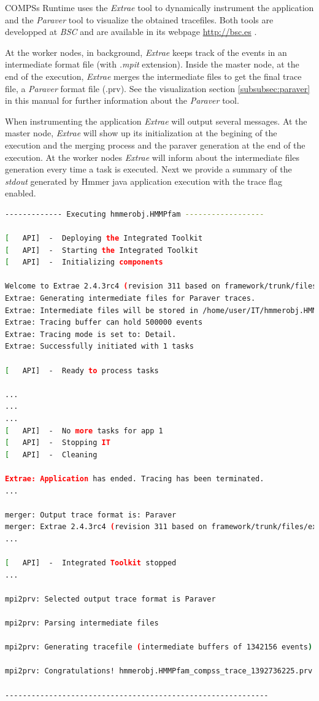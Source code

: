 COMPSs Runtime uses the \textit{Extrae} tool to dynamically instrument the application and the \textit{Paraver} tool to visualize
the obtained tracefiles. Both tools are developped at \textit{BSC} and are available in its webpage \url{http://bsc.es} . 

At the worker nodes, in background, \textit{Extrae} keeps track of the events in an intermediate format 
file (with \textit{.mpit} extension). Inside the master node, at the end of the execution, \textit{Extrae} merges the 
intermediate files to get the final trace file, a \textit{Paraver} format file (.prv). See the visualization 
section \ref{subsubsec:paraver} in this manual for further information about the \textit{Paraver} tool.

When instrumenting the application \textit{Extrae} will output several messages. At the master node, \textit{Extrae} will show up its
initialization at the begining of the execution and the merging process and the paraver generation at the end of the execution. At the
worker nodes \textit{Extrae} will inform about the intermediate files generation every time a task is executed. Next we provide a 
summary of the \textit{stdout} generated by Hmmer java application execution with the trace flag enabled. 
\begin{lstlisting}[language=bash]
------------- Executing hmmerobj.HMMPfam ------------------

[   API]  -  Deploying the Integrated Toolkit
[   API]  -  Starting the Integrated Toolkit
[   API]  -  Initializing components

Welcome to Extrae 2.4.3rc4 (revision 311 based on framework/trunk/files/extrae)
Extrae: Generating intermediate files for Paraver traces.
Extrae: Intermediate files will be stored in /home/user/IT/hmmerobj.HMMPfam
Extrae: Tracing buffer can hold 500000 events
Extrae: Tracing mode is set to: Detail.
Extrae: Successfully initiated with 1 tasks

[   API]  -  Ready to process tasks

...
...
...
[   API]  -  No more tasks for app 1
[   API]  -  Stopping IT
[   API]  -  Cleaning

Extrae: Application has ended. Tracing has been terminated.
...

merger: Output trace format is: Paraver
merger: Extrae 2.4.3rc4 (revision 311 based on framework/trunk/files/extrae)
...

[   API]  -  Integrated Toolkit stopped
...

mpi2prv: Selected output trace format is Paraver

mpi2prv: Parsing intermediate files

mpi2prv: Generating tracefile (intermediate buffers of 1342156 events)

mpi2prv: Congratulations! hmmerobj.HMMPfam_compss_trace_1392736225.prv has been generated.

------------------------------------------------------------
\end{lstlisting}

